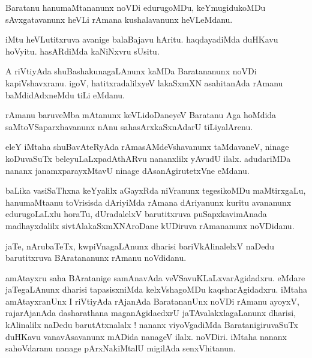 \documentclass{article}
\begin{document}
\begin{mn}%
Baratanu hanumaMtananunx noVDi edurugoMDu, keYmugidukoMDu sAvxgatavanunx heVLi rAmana 
kushalavanunx heVLeMdanu.
\end{mn}

\begin{mn}%
iMtu heVLutitxruva avanige balaBajavu hAritu. haqdayadiMda duHKavu  hoVyitu. hasARdiMda 
kaNiNxvru sUsitu.
\end{mn}

\begin{mn}%
A riVtiyAda shuBashakunagaLAnunx kaMDa Baratananunx noVDi kapiVshavxranu. igoV, 
hatitxradalilxyeV lakaSxmXN asahitanAda rAmanu baMdidAdxneMdu tiLi eMdanu.
\end{mn}

\begin{mn}%
rAmanu baruveMba mAtanunx keVLidoDaneyeV Baratanu Aga hoMdida saMtoVSaparxhavanunx nAnu 
sahasArxkaSxnAdarU tiLiyalArenu.
\end{mn}

\begin{mn}%
eleY iMtaha shuBavAteRyAda rAmasAMdeVshavanunx taMdavaneV, ninage koDuvaSuTx 
beleyuLaLxpadAthARvu nananxlilx yAvudU ilalx. adudariMDa nananx janamxparayxMtavU ninage 
dAsanAgirutetxVne eMdanu.
\end{mn}

\begin{mn}%
baLika vasiSaThxna keYyalilx aGayxRda niVranunx tegesikoMDu maMtirxgaLu, hanumaMtaanu 
toVrisisda dAriyiMda rAmana dAriyanunx kuritu avananunx edurugoLaLxlu horaTu, dUradalelxV 
barutitxruva puSapxkavimAnada madhayxdalilx sivtAlakaSxmXNAroDane kUDiruva rAmananunx 
noVDidanu.
\end{mn}

\begin{mn}%
jaTe, nArubaTeTx, kwpiVnagaLAnunx dharisi bariVkAlinalelxV naDedu barutitxruva BAratananunx 
rAmanu noVdidanu.
\end{mn}

\begin{mn}%
amAtayxru saha BAratanige samAnavAda veVSavuKLaLxvarAgidadxru. eMdare jaTegaLAnunx dharisi 
tapasisxniMda kelxVshagoMDu kaqsharAgidadxru. iMtaha amAtayxranUnx I riVtiyAda rAjanAda 
BaratananUnx noVDi rAmanu ayoyxV, rajarAjanAda dasharathana maganAgidaedxrU 
jaTAvalakxlagaLanunx dharisi, kAlinalilx naDedu barutAtxnalalx ! nananx viyoVgadiMda 
BaratanigiruvaSuTx duHKavu vanavAsavanunx mADida nanageV ilalx. noVDiri. iMtaha nananx 
sahoVdaranu nanage pArxNakiMtalU migilAda senxVhitanun.
\end{mn}
\end{document}

